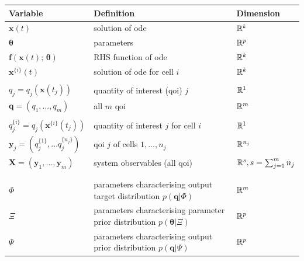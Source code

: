 \begin{table}[htbp]
\centering
\scriptsize
\begin{adjustwidth}{-0.5in}{-0.5in}%
\begin{tabularx}{1.1\textwidth}{lll}
Variable	                                                & Definition                                              & Dimension \\
\toprule
$\boldsymbol{x}(t)$                                     	& solution of ode                                         & $\mathbb{R}^k$ \\
$\boldsymbol{\theta}$                                     	& parameters                                              & $\mathbb{R}^p$ \\
$\boldsymbol{f}(\boldsymbol{x}(t); \, \boldsymbol{\theta})$	& RHS function of ode                                     & $\mathbb{R}^k$ \\
$\boldsymbol{x}^{\{i\}}(t)$                                 & solution of ode for cell $i$                            & $\mathbb{R}^k$ \\
&&\\
$q_j= q_j(\boldsymbol{x}(t_j))$                             & quantity of interest (qoi) $j$                          & $\mathbb{R}^1$ \\
$\boldsymbol{q}= \left( q_1, \dots, q_m \right)$            & all $m$ qoi                                             & $\mathbb{R}^m$ \\
&&\\
$q_j^{\{i\}}= q_j(\boldsymbol{x}^{\{i\}}(t_j))$             & quantity of interest $j$ for cell $i$                   & $\mathbb{R}^1$ \\
$\boldsymbol{y}_j=\left( q_j^{\{1\}}, \dots q_j^{\{n_j\}} \right)$  & qoi $j$ of cells $1, \dots, n_j$                & $\mathbb{R}^{n_j}$ \\
$\boldsymbol{X}=(\boldsymbol{y}_1,...,\boldsymbol{y}_m)$               & system observables (all qoi)                 & $\mathbb{R}^s, s=\sum_{j=1}^m n_j$ \\
&&\\
&&\\
$\Phi$ & parameters characterising output target distribution $p(\boldsymbol{q}|\Phi)$                                & $\mathbb{R}^m$ \\
$\Xi$  & parameters characterising parameter prior distribution $p(\boldsymbol{\theta}|\Xi)$                          & $\mathbb{R}^p$ \\
$\Psi$ & parameters characterising output prior distribution $p(\boldsymbol{q}|\Psi)$                                 & $\mathbb{R}^p$ \\

\end{tabularx}
\end{adjustwidth}
\end{table}
